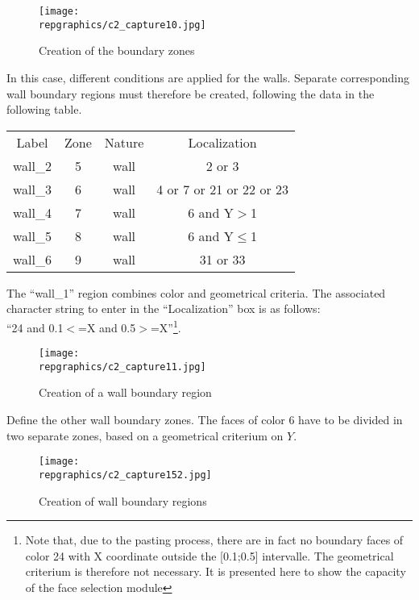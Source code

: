 \begin{figure}[h!]
\begin{center}
\texttt{[image: \\repgraphics/c2\_capture10.jpg]}
\caption{Creation of the boundary zones}
\label{fig10_e2}
\end{center}
\end{figure}


\newpage
In this case, different conditions are applied for the walls. Separate
corresponding wall boundary regions must therefore be created, following the
data in the following table.

\begin{center}
\begin{tabular}{cccc}
Label & Zone & Nature & Localization \\
wall\_2 & 5 & wall & 2 or 3 \\
wall\_3 & 6 & wall & 4 or 7 or 21 or 22 or 23 \\
wall\_4 & 7 & wall & 6 and Y$>$1 \\
wall\_5 & 8 & wall & 6 and Y$\leqslant$1 \\
wall\_6 & 9 & wall & 31 or 33 \\
\end{tabular}
\end{center}

The ``wall\_1'' region combines color and geometrical criteria. The associated
character string to enter in the ``Localization'' box is as follows:\\
``24 and 0.1$<$=X and 0.5$>$=X''\footnote{Note that, due to the pasting process,
there are in fact no boundary faces of color 24 with X coordinate outside the
[0.1;0.5] intervalle. The geometrical criterium is therefore not
necessary. It is presented here to show the capacity of the face selection
module}.

\begin{figure}[h!]
\begin{center}
\texttt{[image: \\repgraphics/c2\_capture11.jpg]}
\caption{Creation of a wall boundary region}
\label{fig11_e2}
\end{center}
\end{figure}


\newpage
Define the other wall boundary zones. The faces of color 6 have to be divided in
two separate zones, based on a geometrical criterium on $Y$.

\begin{figure}[h!]
\begin{center}
\texttt{[image: \\repgraphics/c2\_capture152.jpg]}
\caption{Creation of wall boundary regions}
\label{fig152_e2}
\end{center}
\end{figure}


